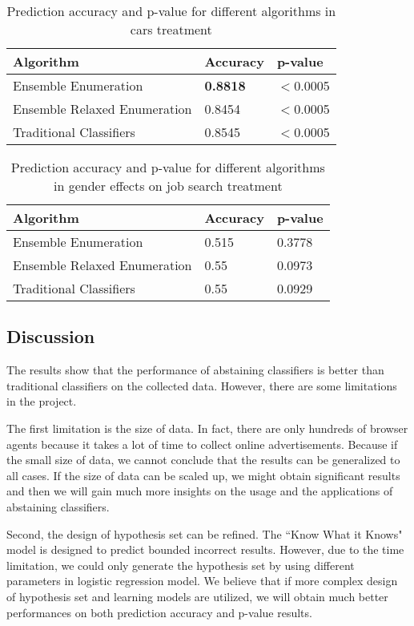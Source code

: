 \documentclass[12pt, journal]{IEEEtran}
\begin{document}
\begin{table}[t]
\centering
\caption{Prediction accuracy and p-value for different algorithms in cars treatment}
\label{cars}
\begin{tabular}{|l|l|l|}
\hline
Algorithm                    & Accuracy        & p-value         \\ \hline
Ensemble Enumeration         & \textbf{0.8818}          & $<$0.0005          \\ \hline
Ensemble Relaxed Enumeration & 0.8454 & $<$0.0005 \\ \hline
Traditional Classifiers      & 0.8545           &  $<$0.0005         \\ \hline
\end{tabular}
\end{table}

\begin{table}[t]
\centering
\caption{Prediction accuracy and p-value for different algorithms in gender effects on job search treatment}
\label{gender}
\begin{tabular}{|l|l|l|}
\hline
Algorithm                    & Accuracy        & p-value         \\ \hline
Ensemble Enumeration         & 0.515          & 0.3778          \\ \hline
Ensemble Relaxed Enumeration & 0.55 & 0.0973 \\ \hline
Traditional Classifiers      & 0.55           &  0.0929         \\ \hline
\end{tabular}
\end{table}

\subsection{Discussion}
The results show that the performance of abstaining classifiers is better than traditional classifiers on the collected data.
However, there are some limitations in the project.

The first limitation is the size of data. In fact, there are only hundreds of browser agents because it takes a lot of time to collect online advertisements.
Because if the small size of data, we cannot conclude that the results can be generalized to all cases.
If the size of data can be scaled up, we might obtain significant results and then we will gain much more insights on the usage and the applications of abstaining classifiers.

Second, the design of hypothesis set can be refined. 
The ``Know What it Knows" model is designed to predict bounded incorrect results.
However, due to the time limitation, we could only generate the hypothesis set by using different parameters in logistic regression model.
We believe that if more complex design of hypothesis set and learning models are utilized, we will obtain much better performances on both prediction accuracy and p-value results. 
\end{document}
